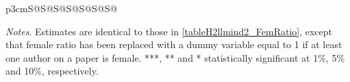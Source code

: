 \begin{table}[H]
\begin{threeparttable}
\begin{tabular}{p{3cm}S@{}S@{}S@{}S@{}S@{}S@{}S@{}}
            \bottomrule
        \end{tabular}
        \begin{tablenotes}
            \tiny
            \item \textit{Notes}. Estimates are identical to those in \autoref{tableH2llmind2_FemRatio}, except that female ratio has been replaced with a dummy variable equal to 1 if at least one author on a paper is female. ***, ** and * statistically significant at 1\%, 5\% and 10\%, respectively.
        \end{tablenotes}
    \end{threeparttable}
\end{table}